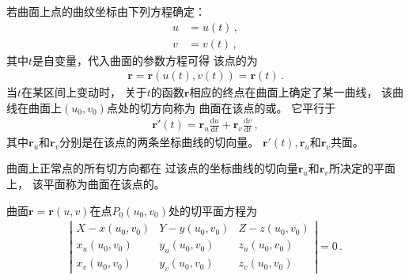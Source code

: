 若曲面上点的曲纹坐标由下列方程确定：
\begin{align}\label{eq:03ex01.13}
    u & =u(t)\, , \\
    v & =v(t)\, ,
\end{align}
其中$t$是自变量，代入曲面的参数方程可得
该点的为
\begin{align}\label{eq:03ex01.14}
    \bm r=\bm r\left(u(t),v(t)\right)=\bm r(t)\, .
\end{align}
当$t$在某区间上变动时，
关于$t$的函数$\bm r$相应的终点在曲面上确定了某一曲线，
该曲线在曲面上$(u_0,v_0)$点处的切方向称为
曲面在该点的或。
它平行于
\begin{align}\label{eq:03ex01.15}
    \bm r'(t)=\bm r_u\frac{\mathrm{d}u}{\mathrm{d}t}+\bm r_v\frac{\mathrm{d}v}{\mathrm{d}t}\, ,
\end{align}
其中$\bm r_u$和$\bm r_v$分别是在该点的两条坐标曲线的切向量。
$\bm r'(t),\bm r_u$和$\bm r_v$共面。
\begin{definition}
    曲面上正常点的所有切方向都在
    过该点的坐标曲线的切向量$\bm r_u$和$\bm r_v$所决定的平面上，
    该平面称为曲面在该点的。
\end{definition}
\begin{corollary}
    曲面$\bm r=\bm r(u,v)$在点$P_0(u_0,v_0)$处的切平面方程为
    \begin{align}\label{eq:03ex01.16}
        \left|
        \begin{array}{ccc}
            X-x(u_0,v_0) & Y-y(u_0,v_0) & Z-z(u_0,v_0) \\
            x_u(u_0,v_0) & y_u(u_0,v_0) & z_u(u_0,v_0) \\
            x_v(u_0,v_0) & y_v(u_0,v_0) & z_v(u_0,v_0)
        \end{array}\right|=0\, .
    \end{align}
\end{corollary}

